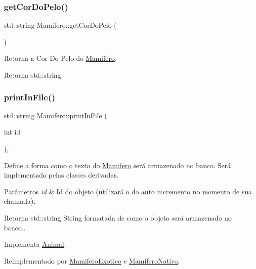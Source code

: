 \subsubsection{\texorpdfstring{get\+Cor\+Do\+Pelo()}{getCorDoPelo()}}
{\footnotesize\ttfamily std\+::string Mamifero\+::get\+Cor\+Do\+Pelo (\begin{DoxyParamCaption}{ }\end{DoxyParamCaption})}



Retorna a Cor Do Pelo do \hyperlink{classMamifero}{Mamifero}. 

\begin{DoxyReturn}{Retorna}
std\+::string 
\end{DoxyReturn}
\mbox{\label{classMamifero_a88e6c2efe9180611486f82d4dbf308ba}} 
\subsubsection{\texorpdfstring{print\+In\+File()}{printInFile()}}
{\footnotesize\ttfamily std\+::string Mamifero\+::print\+In\+File (\begin{DoxyParamCaption}\item[{int}]{id }\end{DoxyParamCaption})\hspace{0.3cm}{\ttfamily [protected]}, {\ttfamily [virtual]}}



Define a forma como o texto do \hyperlink{classMamifero}{Mamifero} será armazenado no banco. Será implementado pelas classes derivadas. 


\begin{DoxyParams}{Parâmetros}
{\em id} & Id do objeto (utilizará o do auto incremento no momento de sua chamada). \\
\hline
\end{DoxyParams}
\begin{DoxyReturn}{Retorna}
std\+::string String formatada de como o objeto será armazenado no banco.. 
\end{DoxyReturn}


Implementa \hyperlink{classAnimal_ac75406040726a6339932d70164cc7242}{Animal}.



Reimplementado por \hyperlink{classMamiferoExotico_a4ee6f5f4a2917cfdf54304525add0c4a}{Mamifero\+Exotico} e \hyperlink{classMamiferoNativo_ae2f2b00cb6720cea2780ebef78be52ea}{Mamifero\+Nativo}.

